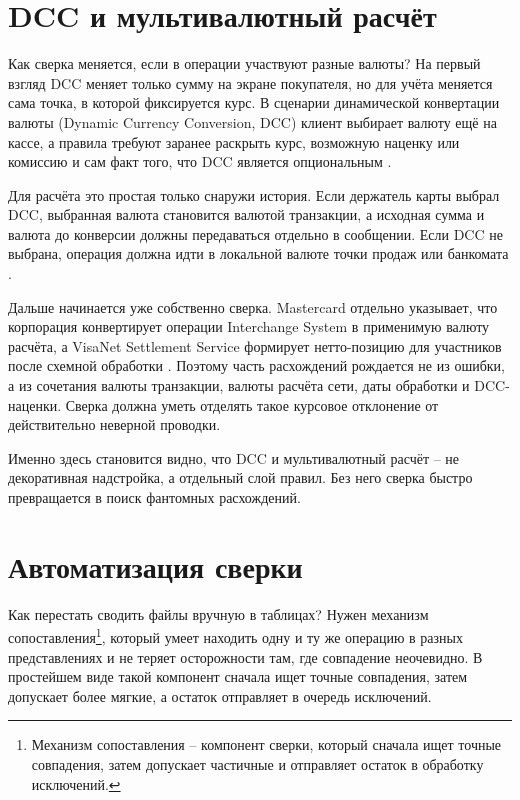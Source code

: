 \section{DCC и мультивалютный расчёт}
\label{sec:recon-dcc}

Как сверка меняется, если в операции участвуют разные валюты? На первый
взгляд DCC меняет только сумму на экране покупателя, но для учёта
меняется сама точка, в которой фиксируется курс. В сценарии
динамической конвертации валюты (Dynamic Currency Conversion, DCC)
клиент выбирает валюту ещё на кассе, а правила требуют заранее
раскрыть курс, возможную наценку или комиссию и сам факт того, что DCC
является опциональным \cite{visa-core-rules}\cite{mc-tpr}.

Для расчёта это простая только снаружи история. Если держатель карты
выбрал DCC, выбранная валюта становится валютой транзакции, а исходная
сумма и валюта до конверсии должны передаваться отдельно в сообщении.
Если DCC не выбрана, операция должна идти в локальной валюте точки
продаж или банкомата \cite{visa-core-rules}\cite{mc-tpr}.

Дальше начинается уже собственно сверка. Mastercard отдельно указывает,
что корпорация конвертирует операции Interchange System в применимую
валюту расчёта, а VisaNet Settlement Service формирует нетто-позицию
для участников после схемной обработки \cite{mc-rules}\cite{visa-core-rules}.
Поэтому часть расхождений рождается не из ошибки, а из сочетания
валюты транзакции, валюты расчёта сети, даты обработки и DCC-наценки.
Сверка должна уметь отделять такое курсовое отклонение от действительно
неверной проводки.

Именно здесь становится видно, что DCC и мультивалютный расчёт --
не декоративная надстройка, а отдельный слой правил. Без него сверка
быстро превращается в поиск фантомных расхождений.

\section{Автоматизация сверки}
\label{sec:recon-automation}

Как перестать сводить файлы вручную в таблицах? Нужен механизм
сопоставления\footnote{Механизм сопоставления -- компонент сверки,
который сначала ищет точные совпадения, затем допускает частичные и
отправляет остаток в обработку исключений.}, который умеет находить
одну и ту же операцию в разных представлениях и не теряет осторожности
там, где совпадение неочевидно. В простейшем виде такой компонент
сначала ищет точные совпадения, затем допускает более мягкие, а
остаток отправляет в очередь исключений.

